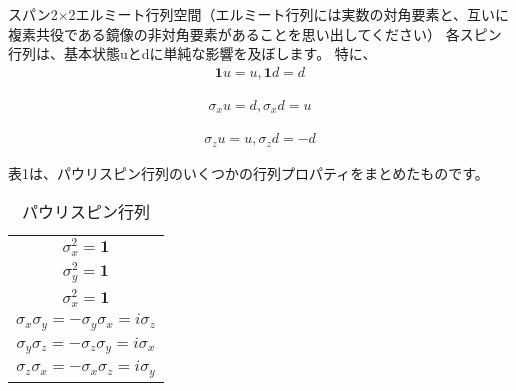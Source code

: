 スパン2×2エルミート行列空間（エルミート行列には実数の対角要素と、互いに複素共役である鏡像の非対角要素があることを思い出してください）
各スピン行列は、基本状態uとdに単純な影響を及ぼします。 特に、
\begin{eqnarray}
\label{13}
\mathbf{1} u = u, 
\mathbf{1} d = d 
\end{eqnarray}

\begin{eqnarray}
\label{14}
\sigma_x u = d, 
\sigma_x d = u
\end{eqnarray}

\begin{eqnarray}
\label{15}
\sigma_z u = u, 
\sigma_z d = - d
\end{eqnarray}
 
表1は、パウリスピン行列のいくつかの行列プロパティをまとめたものです。

\begin{table}
\label{t1}
\caption{パウリスピン行列}
\centering
\begin{tabular}{|c|} \hline
$\sigma_x^2 = \mathbf{1} $ \\ 
$\sigma_y^2 = \mathbf{1} $ \\
$\sigma_x^2 = \mathbf{1} $\\
$\sigma_x \sigma_y = - \sigma_y \sigma_x = i \sigma_z$ \\
$\sigma_y \sigma_z = - \sigma_z \sigma_y = i \sigma_x$ \\
$\sigma_z \sigma_x = - \sigma_x \sigma_z = i \sigma_y$ \\ \hline
\end{tabular}
\end{table}



